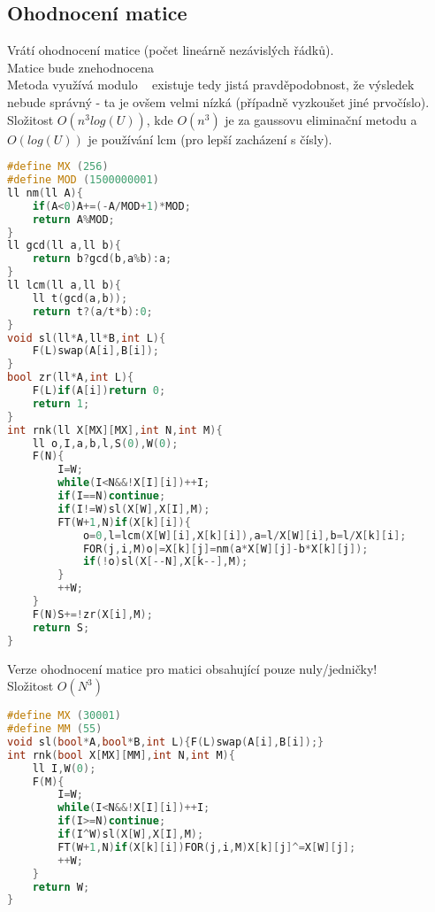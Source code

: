 \documentclass[11pt]{article}
\begin{document}
\subsection{Ohodnocení matice}
Vrátí ohodnocení matice (počet lineárně nezávislých řádků).
\\Matice bude znehodnocena
\\Metoda využívá modulo ~ existuje tedy jistá pravděpodobnost, že výsledek nebude správný - ta je ovšem velmi nízká (případně vyzkoušet jiné prvočíslo).
\\Složitost $O(n^3log(U))$, kde $O(n^3)$ je za gaussovu eliminační metodu a $O(log(U))$ je používání lcm (pro lepší zacházení s čísly).
\begin{lstlisting}[language=C++]
#define MX (256)
#define MOD (1500000001)
ll nm(ll A){
    if(A<0)A+=(-A/MOD+1)*MOD;
    return A%MOD;
}
ll gcd(ll a,ll b){  
    return b?gcd(b,a%b):a;    
}
ll lcm(ll a,ll b){
    ll t(gcd(a,b));
    return t?(a/t*b):0;
}
void sl(ll*A,ll*B,int L){
    F(L)swap(A[i],B[i]);
}
bool zr(ll*A,int L){
    F(L)if(A[i])return 0;
    return 1;
}
int rnk(ll X[MX][MX],int N,int M){
    ll o,I,a,b,l,S(0),W(0);
    F(N){
        I=W;
        while(I<N&&!X[I][i])++I;
        if(I==N)continue;
        if(I!=W)sl(X[W],X[I],M);
        FT(W+1,N)if(X[k][i]){
            o=0,l=lcm(X[W][i],X[k][i]),a=l/X[W][i],b=l/X[k][i];
            FOR(j,i,M)o|=X[k][j]=nm(a*X[W][j]-b*X[k][j]);
            if(!o)sl(X[--N],X[k--],M);
        }
        ++W;
    }
    F(N)S+=!zr(X[i],M);
    return S;
}
\end{lstlisting}
Verze ohodnocení matice pro matici obsahující pouze nuly/jedničky!
\\Složitost $O(N^3)$
\begin{lstlisting}[language=C++]
#define MX (30001)
#define MM (55)
void sl(bool*A,bool*B,int L){F(L)swap(A[i],B[i]);}
int rnk(bool X[MX][MM],int N,int M){
    ll I,W(0);
    F(M){
        I=W;
        while(I<N&&!X[I][i])++I;
        if(I>=N)continue;
        if(I^W)sl(X[W],X[I],M);
        FT(W+1,N)if(X[k][i])FOR(j,i,M)X[k][j]^=X[W][j];
        ++W;
    }
    return W;
}
\end{lstlisting}
\end{document}
